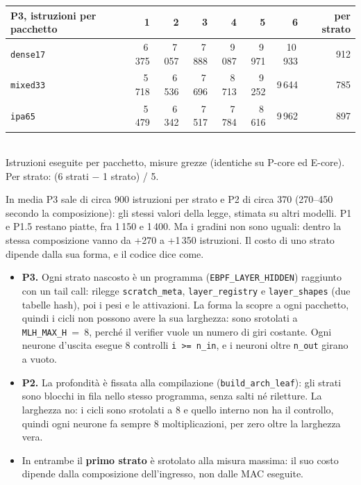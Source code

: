 \documentclass[11pt,a4paper,oneside]{report}
\begin{document}
\begin{center}
\small
\begin{tabular}{@{}lrrrrrrr@{}}
\toprule
\textbf{P3, istruzioni per pacchetto} & \textbf{1} & \textbf{2} & \textbf{3} & \textbf{4} & \textbf{5} & \textbf{6} & \textbf{per strato} \\
\midrule
\texttt{dense17} & 6\,375 & 7\,057 & 7\,888 & 9\,087 & 9\,971 & 10\,933 & 912 \\
\texttt{mixed33} & 5\,718 & 6\,536 & 7\,696 & 8\,713 & 9\,252 & 9\,644  & 785 \\
\texttt{ipa65}   & 5\,479 & 6\,342 & 7\,517 & 7\,784 & 8\,616 & 9\,962  & 897 \\
\bottomrule
\end{tabular}\\[2pt]
{\footnotesize\color{soft} Istruzioni eseguite per pacchetto, misure grezze
(identiche su P-core ed E-core). Per strato: (6 strati $-$ 1 strato) / 5.}
\end{center}

In media P3 sale di circa 900 istruzioni per strato e P2 di circa 370 (270--450
secondo la composizione): gli stessi valori della legge, stimata su altri
modelli. P1 e P1.5 restano piatte, fra 1\,150 e 1\,400. Ma i gradini non sono
uguali: dentro la stessa composizione vanno da +270 a +1\,350 istruzioni. Il
costo di uno strato dipende dalla sua forma, e il codice dice come.

\begin{itemize}
  \item \textbf{P3.} Ogni strato nascosto è un programma
        (\texttt{EBPF\_LAYER\_HIDDEN}) raggiunto con un tail call: rilegge
        \texttt{scratch\_meta}, \texttt{layer\_registry} e
        \texttt{layer\_shapes} (due tabelle hash), poi i pesi e le attivazioni.
        La forma la scopre a ogni pacchetto, quindi i cicli non possono avere
        la sua larghezza: sono srotolati a \texttt{MLH\_MAX\_H}~=~8, perché il
        verifier vuole un numero di giri costante. Ogni neurone d'uscita
        esegue 8 controlli \texttt{i >= n\_in}, e i neuroni oltre
        \texttt{n\_out} girano a vuoto.
  \item \textbf{P2.} La profondità è fissata alla compilazione
        (\texttt{build\_arch\_leaf}): gli strati sono blocchi in fila nello
        stesso programma, senza salti né riletture. La larghezza no: i cicli
        sono srotolati a 8 e quello interno non ha il controllo, quindi ogni
        neurone fa sempre 8 moltiplicazioni, per zero oltre la larghezza vera.
  \item In entrambe il \textbf{primo strato} è srotolato alla misura massima: il
        suo costo dipende dalla composizione dell'ingresso, non dalle MAC
        eseguite.
\end{itemize}
\end{document}
